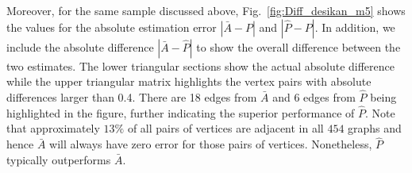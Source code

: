 \documentclass[10pt,letterpaper]{article}
\renewcommand{\hat}{\widehat}
\begin{document}
Moreover, for the same sample discussed above, Fig.~\ref{fig:Diff_desikan_m5} shows the values for the absolute estimation error $|\bar{A} - P|$ and $|\hat{P}-P|$. In addition, we include the absolute difference $|\bar{A} - \hat{P}|$ to show the overall difference between the two estimates. The lower triangular sections show the actual absolute difference while the upper triangular matrix highlights the vertex pairs with absolute differences larger than 0.4. 
There are 18 edges from $\bar{A}$ and 6 edges from $\hat{P}$ being highlighted in the figure, further indicating the superior performance of $\hat{P}$.
Note that approximately $13\%$ of all pairs of vertices are adjacent in all $454$ graphs and hence $\bar{A}$ will always have zero error for those pairs of vertices.
Nonetheless, $\hat{P}$ typically outperforms $\bar{A}$.
\end{document}
